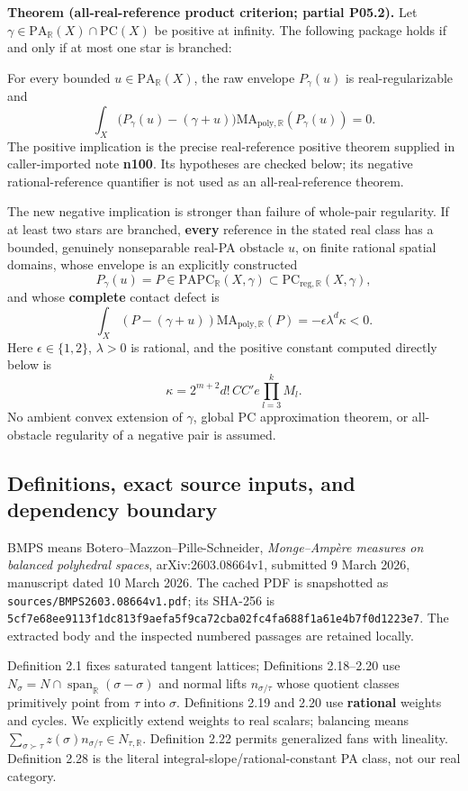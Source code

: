 \documentclass[
  11pt,
]{article}
\begin{document}
\textbf{Theorem (all-real-reference product criterion; partial P05.2).}
Let \(\gamma\in\mathrm{PA}_{\mathbb R}(X)\cap\mathrm{PC}(X)\) be
positive at infinity. The following package holds if and only if at most
one star is branched:

For every bounded \(u\in\mathrm{PA}_{\mathbb R}(X)\), the raw envelope
\(P_\gamma(u)\) is real-regularizable and \[
\int_X\bigl(P_\gamma(u)-(\gamma+u)\bigr)
\mathrm{MA}_{\mathrm{poly},\mathbb R}(P_\gamma(u))=0.
\tag{T}
\] The positive implication is the precise real-reference positive
theorem supplied in caller-imported note \textbf{n100}. Its hypotheses
are checked below; its negative rational-reference quantifier is not
used as an all-real-reference theorem.

The new negative implication is stronger than failure of whole-pair
regularity. If at least two stars are branched, \textbf{every} reference
in the stated real class has a bounded, genuinely nonseparable real-PA
obstacle \(u\), on finite rational spatial domains, whose envelope is an
explicitly constructed \[
P_\gamma(u)=P\in\mathrm{PAPC}_{\mathbb R}(X,\gamma)
\subset\mathrm{PC}_{\mathrm{reg},\mathbb R}(X,\gamma),
\] and whose \textbf{complete} contact defect is \[
\int_X(P-(\gamma+u))\mathrm{MA}_{\mathrm{poly},\mathbb R}(P)
=-\epsilon\lambda^d\kappa<0.
\tag{N}
\] Here \(\epsilon\in\{1,2\}\), \(\lambda>0\) is rational, and the
positive constant computed directly below is \[
\kappa=2^{m+2}d!\,CC'e\prod_{l=3}^k M_l.
\tag{K}
\] No ambient convex extension of \(\gamma\), global PC approximation
theorem, or all-obstacle regularity of a negative pair is assumed.

\subsection{Definitions, exact source inputs, and dependency
boundary}\label{definitions-exact-source-inputs-and-dependency-boundary}

BMPS means Botero--Mazzon--Pille-Schneider, \emph{Monge--Ampère measures
on balanced polyhedral spaces}, arXiv:2603.08664v1, submitted 9 March
2026, manuscript dated 10 March 2026. The cached PDF is snapshotted as
\texttt{sources/BMPS2603.08664v1.pdf}; its SHA-256 is
\texttt{5cf7e68ee9113f1dc813f9aefa5f9ca72cba02fc4fa688f1a61e4b7f0d1223e7}.
The extracted body and the inspected numbered passages are retained
locally.

Definition 2.1 fixes saturated tangent lattices; Definitions 2.18--2.20 use
\(N_\sigma=N\cap\operatorname{span}_{\mathbb R}(\sigma-\sigma)\) and
normal lifts \(n_{\sigma/\tau}\) whose quotient classes primitively
point from \(\tau\) into \(\sigma\). Definitions 2.19 and 2.20 use
\textbf{rational} weights and cycles. We explicitly extend weights to
real scalars; balancing means
\(\sum_{\sigma\succ\tau}z(\sigma)n_{\sigma/\tau}\in N_{\tau,\mathbb R}\).
Definition 2.22 permits generalized fans with lineality. Definition 2.28
is the literal integral-slope/rational-constant PA class, not our real
category.
\end{document}
